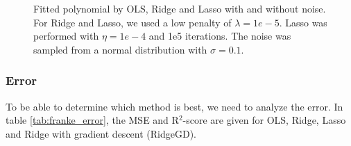 \begin{figure} [H]
    \caption{Fitted polynomial by OLS, Ridge and Lasso with and without noise. For Ridge and Lasso, we used a low penalty of $\lambda=1e-5$. Lasso was performed with $\eta=1e-4$ and 1e5 iterations. The noise was sampled from a normal distribution with $\sigma=0.1$.}%
    \label{fig:franke_plots}%
\end{figure}
\restoregeometry


\subsubsection{Error}
To be able to determine which method is best, we need to analyze the error. In table \eqref{tab:franke_error}, the MSE and R$^2$-score are given for OLS, Ridge, Lasso and Ridge with gradient descent (RidgeGD). 


